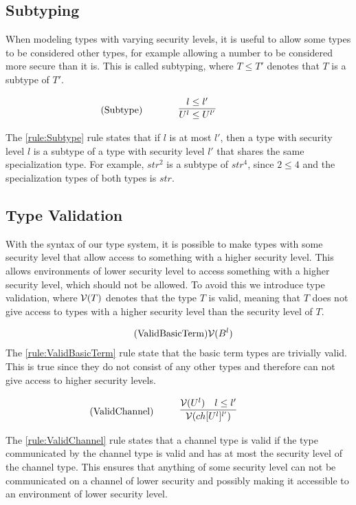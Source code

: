 \subsection{Subtyping}
When modeling types with varying security levels, it is useful to allow some types to be considered other types, for example allowing a number to be considered more secure than it is.
This is called subtyping, where $T\leq T'$ denotes that $T$ is a subtype of $T'$. 

\begin{align*}
   \tag{Subtype}\label{rule:Subtype} &\infrule{l\leq l'}{U^l\leq U^{l'}}
\end{align*}
The \ref{rule:Subtype} rule states that if $l$ is at most $l'$, then a type with security level $l$ is a subtype of a type with security level $l'$ that shares the same specialization type.
For example, $str^2$ is a subtype of $str^4$, since $2\leq4$ and the specialization types of both types is $str$.

\subsection{Type Validation}
With the syntax of our type system, it is possible to make types with some security level that allow access to something with a higher security level.
This allows environments of lower security level to access something with a higher security level, which should not be allowed.
To avoid this we introduce type validation, where $\mathcal{V}(T)$ denotes that the type $T$ is valid, meaning that $T$ does not give access to types with a higher security level than the security level of $T$.

\begin{align*}
    \tag{ValidBasicTerm}\label{rule:ValidBasicTerm} &\mathcal{V}(B^l)
\end{align*}
The \ref{rule:ValidBasicTerm} rule state that the basic term types are trivially valid.
This is true since they do not consist of any other types and therefore can not give access to higher security levels.

\begin{align*}
    \tag{ValidChannel}\label{rule:ValidChannel} &\infrule{\valid{U^l}\quad l\leq l'}{\valid{ch[U^l]^{l'}}}
\end{align*}
The \ref{rule:ValidChannel} rule states that a channel type is valid if the type communicated by the channel type is valid and has at most the security level of the channel type.
This ensures that anything of some security level can not be communicated on a channel of lower security and possibly making it accessible to an environment of lower security level.

